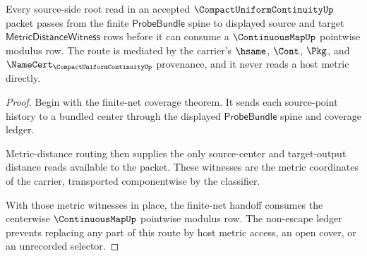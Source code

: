 \begin{theorem}
\label{thm:compact-uniform-continuity-probe-metric-route}
Every source-side root read in an accepted $\CompactUniformContinuityUp$ packet passes from the finite $\mathsf{ProbeBundle}$ spine to displayed source and target $\mathsf{MetricDistanceWitness}$ rows before it can consume a $\ContinuousMapUp$ pointwise modulus row. The route is mediated by the carrier's $\hsame$, $\Cont$, $\Pkg$, and $\NameCert_{\CompactUniformContinuityUp}$ provenance, and it never reads a host metric directly.
\end{theorem}
\begin{proof}
Begin with the finite-net coverage theorem. It sends each source-point history to a bundled center through the displayed $\mathsf{ProbeBundle}$ spine and coverage ledger.

Metric-distance routing then supplies the only source-center and target-output distance reads available to the packet. These witnesses are the metric coordinates of the carrier, transported componentwise by the classifier.

With those metric witnesses in place, the finite-net handoff consumes the centerwise $\ContinuousMapUp$ pointwise modulus row. The non-escape ledger prevents replacing any part of this route by host metric access, an open cover, or an unrecorded selector.
\end{proof}

